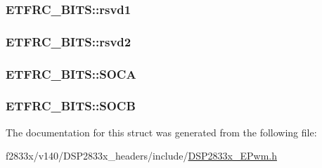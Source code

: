 \subsubsection[{rsvd1}]{ E\+T\+F\+R\+C\+\_\+\+B\+I\+T\+S\+::rsvd1}\label{struct_e_t_f_r_c___b_i_t_s_a4e9f74b4a588cc1d6304c53c53a36fe7}
\hypertarget{struct_e_t_f_r_c___b_i_t_s_a06beb0b06a675ceac3abd84354508697}{}
\subsubsection[{rsvd2}]{ E\+T\+F\+R\+C\+\_\+\+B\+I\+T\+S\+::rsvd2}\label{struct_e_t_f_r_c___b_i_t_s_a06beb0b06a675ceac3abd84354508697}
\hypertarget{struct_e_t_f_r_c___b_i_t_s_a1a07c6ec06e2172948ef67d07b854b09}{}
\subsubsection[{S\+O\+C\+A}]{ E\+T\+F\+R\+C\+\_\+\+B\+I\+T\+S\+::\+S\+O\+C\+A}\label{struct_e_t_f_r_c___b_i_t_s_a1a07c6ec06e2172948ef67d07b854b09}
\hypertarget{struct_e_t_f_r_c___b_i_t_s_ad6c61eba7afe447dee0f2d50cde20205}{}
\subsubsection[{S\+O\+C\+B}]{ E\+T\+F\+R\+C\+\_\+\+B\+I\+T\+S\+::\+S\+O\+C\+B}\label{struct_e_t_f_r_c___b_i_t_s_ad6c61eba7afe447dee0f2d50cde20205}


The documentation for this struct was generated from the following file\+:\begin{DoxyCompactItemize}
\item 
f2833x/v140/\+D\+S\+P2833x\+\_\+headers/include/\hyperlink{_d_s_p2833x___e_pwm_8h}{D\+S\+P2833x\+\_\+\+E\+Pwm.\+h}\end{DoxyCompactItemize}
